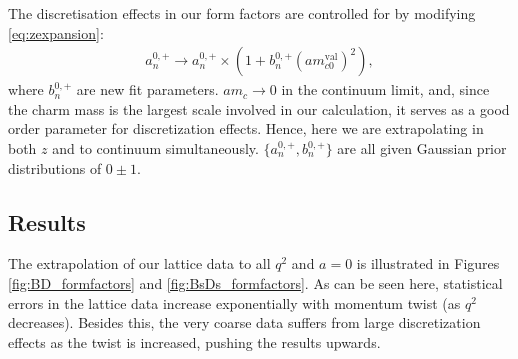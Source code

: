 The discretisation effects in our form factors are controlled for by modifying \eqref{eq:zexpansion}:
\begin{align}
	a^{0,+}_n \to a^{0,+}_n \times ( 1 + b^{0,+}_n (am^{\text{val}}_{c0})^2 ),
\end{align}
where $b^{0,+}_n$ are new fit parameters. $am_c\to0$ in the continuum limit, and, since the charm mass is the largest scale involved in our calculation, it serves as a good order parameter for discretization effects. Hence, here we are extrapolating in both $z$ and to continuum simultaneously. $\{a_n^{0,+},b_n^{0,+}\}$ are all given Gaussian prior distributions of $0\pm 1$.

\subsection{Results}


The extrapolation of our lattice data to all $q^2$ and $a=0$ is illustrated in Figures \ref{fig:BD_formfactors} and \ref{fig:BsDs_formfactors}. As can be seen here, statistical errors in the lattice data increase exponentially with momentum twist (as $q^2$ decreases). Besides this, the very coarse data suffers from large discretization effects as the twist is increased, pushing the results upwards.

